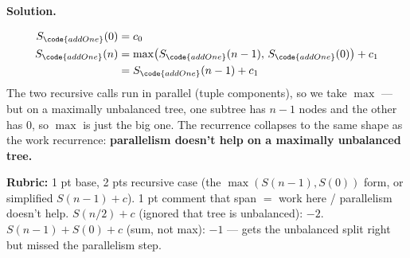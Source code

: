 \documentclass[crop=false]{standalone}
\newenvironment{solution}
    {\par\color{solution_color}\begin{framed}\textbf{Solution.}\par}
    {\end{framed}}
\begin{document}
\begin{solution}
\begin{align*}
  S_{\code{addOne}}(0) &= c_0 \\
  S_{\code{addOne}}(n) &= \max\!\left(S_{\code{addOne}}(n-1),\,S_{\code{addOne}}(0)\right) + c_1 \\
                       &= S_{\code{addOne}}(n-1) + c_1
\end{align*}
The two recursive calls run in parallel (tuple components), so we take
$\max$ --- but on a maximally unbalanced tree, one subtree has $n-1$
nodes and the other has $0$, so $\max$ is just the big one. The
recurrence collapses to the same shape as the work recurrence:
\textbf{parallelism doesn't help on a maximally unbalanced tree.}

\textbf{Rubric:} 1 pt base, 2 pts recursive case (the
$\max(S(n-1), S(0))$ form, or simplified $S(n-1) + c$).
1 pt comment that span $=$ work here / parallelism doesn't help.
$S(n/2) + c$ (ignored that tree is unbalanced): $-2$.
$S(n-1) + S(0) + c$ (sum, not max): $-1$ --- gets the unbalanced split
right but missed the parallelism step.
\end{solution}
\end{document}
